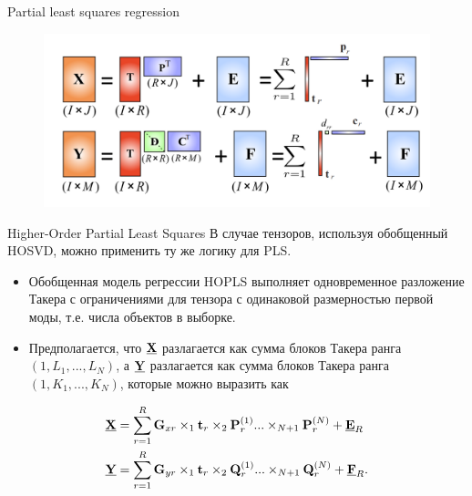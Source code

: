 \begin{frame}{Partial least squares regression}
\begin{figure}
    \centering
    \includegraphics[width=1\textwidth]{lecture_13/figs/PLS_2D.png}
\end{figure}
\end{frame}
\begin{frame}{Higher-Order Partial Least Squares}
В случае тензоров, используя обобщенный HOSVD, можно применить ту же логику для PLS.\\
\begin{itemize}
    \item Обобщенная модель регрессии HOPLS выполняет одновременное разложение Такера с ограничениями для тензора с одинаковой размерностью первой моды, т.е. числа объектов в выборке.
    \item Предполагается, что $\underline{\textbf{X}}$ разлагается как сумма блоков Такера ранга $(1, L_1,..., L_N)$, а  $\underline{\textbf{Y}}$ разлагается как сумма блоков Такера ранга $(1, K_1,..., K_N)$, которые можно выразить как
\end{itemize}
 $$
\begin{aligned}[t]
    \underline{\textbf{X}} &= \sum_{r=1}^{R}\textbf{G}_{xr}
    \times_1\textbf{t}_r
    \times_2\textbf{P}_r^{(1)}
    ...
    \times_{N+1}\textbf{P}_r^{(N)}
    + \underline{\textbf{E}}_R\\
    \underline{\textbf{Y}} &= \sum_{r=1}^{R}\textbf{G}_{yr}
    \times_1\textbf{t}_r
    \times_2\textbf{Q}_r^{(1)}
    ...
    \times_{N+1}\textbf{Q}_r^{(N)}
    + \underline{\textbf{F}}_R.
\end{aligned}
 $$
\end{frame}

